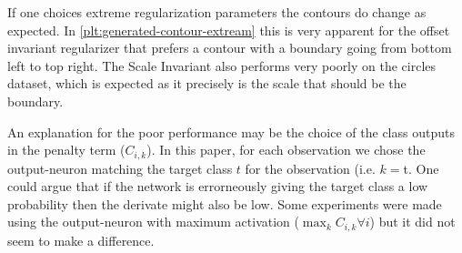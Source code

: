 If one choices extreme regularization parameters the contours do change as expected. In \cref{plt:generated-contour-extream} this is very apparent for the offset invariant regularizer that prefers a contour with a boundary going from bottom left to top right. The Scale Invariant also performs very poorly on the circles dataset, which is expected as it precisely is the scale that should be the boundary.

An explanation for the poor performance may be the choice of the class outputs in the penalty term ($C_{i,k}$). In this paper, for each observation we chose the output-neuron matching the target class $t$ for the observation (i.e. $k=$t. One could argue that if the network is errorneously giving the target class a low probability then the derivate might also be low. Some experiments were made using the output-neuron with maximum activation ($\max_k C_{i,k} \forall i$) but it did not seem to make a difference.
